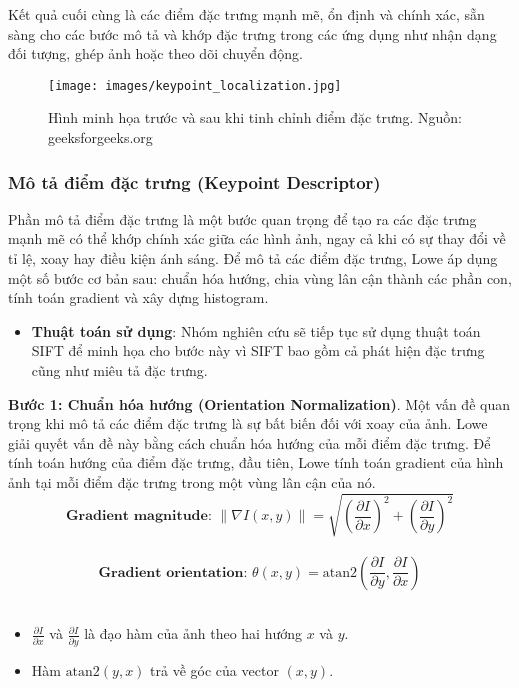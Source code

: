 Kết quả cuối cùng là các điểm đặc trưng mạnh mẽ, ổn định và chính xác, sẵn sàng cho các bước mô tả và khớp đặc trưng trong các ứng dụng như nhận dạng đối tượng, ghép ảnh hoặc theo dõi chuyển động.
\begin{figure}[H]
	\centering
	\texttt{[image: images/keypoint\_localization.jpg]}
	\caption{Hình minh họa trước và sau khi tinh chỉnh điểm đặc trưng. Nguồn: geeksforgeeks.org\cite{gfg}}
\end{figure}
\subsubsection{Mô tả điểm đặc trưng (Keypoint Descriptor)}
Phần mô tả điểm đặc trưng là một bước quan trọng để tạo ra các đặc trưng mạnh mẽ có thể khớp chính xác giữa các hình ảnh, ngay cả khi có sự thay đổi về tỉ lệ, xoay hay điều kiện ánh sáng. Để mô tả các điểm đặc trưng, Lowe áp dụng một số bước cơ bản sau: chuẩn hóa hướng, chia vùng lân cận thành các phần con, tính toán gradient và xây dựng histogram.
\begin{itemize}
	\item \textbf{Thuật toán sử dụng}: Nhóm nghiên cứu sẽ tiếp tục sử dụng thuật toán SIFT để minh họa cho bước này vì SIFT bao gồm cả phát hiện đặc trưng cũng như miêu tả đặc trưng.
\end{itemize}

\textbf{Bước 1: Chuẩn hóa hướng (Orientation Normalization)}. Một vấn đề quan trọng khi mô tả các điểm đặc trưng là sự bất biến đối với xoay của ảnh. Lowe giải quyết vấn đề này bằng cách chuẩn hóa hướng của mỗi điểm đặc trưng. Để tính toán hướng của điểm đặc trưng, đầu tiên, Lowe tính toán gradient của hình ảnh tại mỗi điểm đặc trưng trong một vùng lân cận của nó.\\
\[ \textbf{Gradient magnitude: } \| \nabla I(x, y) \| = \sqrt{\left( \frac{\partial I}{\partial x} \right)^2 + \left( \frac{\partial I}{\partial y} \right)^2} \]
\\
\[ \textbf{Gradient orientation: } \theta(x, y) = \text{atan2} \left( \frac{\partial I}{\partial y}, \frac{\partial I}{\partial x} \right) \]
\\
\begin{itemize}
	\item \( \frac{\partial I}{\partial x} \) và \( \frac{\partial I}{\partial y} \) là đạo hàm của ảnh theo hai hướng \(x\) và \(y\).
	\item Hàm \( \text{atan2}(y, x) \) trả về góc của vector \((x, y)\).
\end{itemize}

